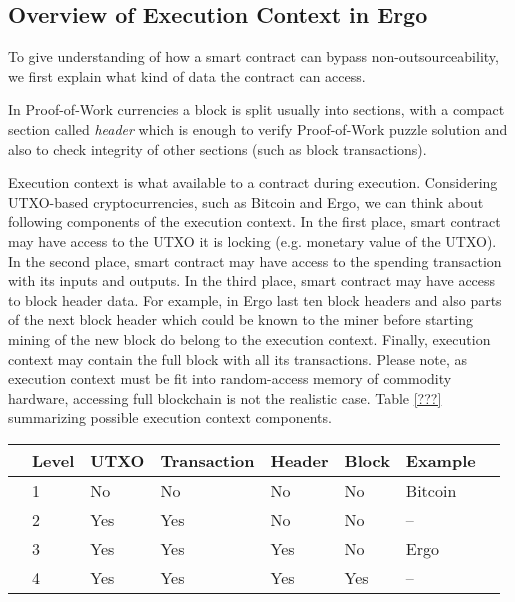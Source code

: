 \documentclass[11pt]{article}
\begin{document}

\subsection{Overview of Execution Context in Ergo}

To give understanding of how a smart contract can bypass non-outsourceability, we first explain what kind of data the contract
can access.

In Proof-of-Work currencies a block is split usually into sections, with a compact section called {\em header} which is
enough to verify Proof-of-Work puzzle solution and also to check integrity of other sections (such as block transactions).

Execution context is what available to a contract during execution. Considering UTXO-based cryptocurrencies, such as
Bitcoin and Ergo, we can think about following components of the execution context. In the first place, smart contract
 may have access to the UTXO it is locking (e.g. monetary value of the UTXO). In the second place, smart contract may
 have access to the spending transaction with its inputs and outputs. In the third place, smart contract may have access
 to block header data. For example, in Ergo last ten block headers and also parts of the next block header which could
 be known to the miner before starting mining of the new block do belong to the execution context. Finally, execution
 context may contain the full block with all its transactions. Please note, as execution context must be fit into
 random-access memory of commodity hardware, accessing full blockchain is not the realistic case. Table \ref{???}
 summarizing possible execution context components.


\begin{tabular}{llllllll}
	& Level & UTXO & Transaction & Header      & Block & Example \\ \hline
	& 1     & No  & No          & No  		   & No    & Bitcoin \\
	& 2     & Yes & Yes         & No 		   & No    & -- \\
	& 3     & Yes & Yes         & Yes 		   & No    & Ergo    \\
	& 4     & Yes & Yes         & Yes 		   & Yes   & --    \\
\end{tabular}
	
\end{document}
